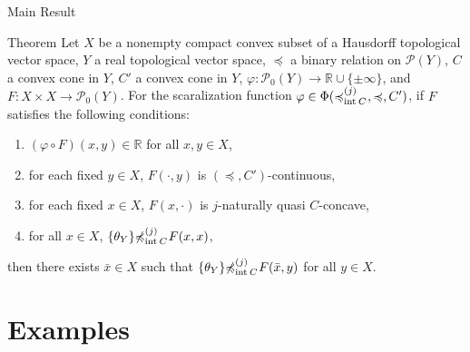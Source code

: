 \documentclass[aspectratio=169, dvipdfmx, 11pt]{beamer}
\newcommand{\RealNumberSet}{\mathbb{R}}
\newcommand{\Interior}[1]{\text{\rm int\:${#1}$}} %
\newcommand{\pow}[1]{\mathcal{P}_{0}(#1)}
\newcommand{\setrel}[2]{\preccurlyeq^{(#1)}_{#2}\!}
\newcommand{\notsetrel}[2]{{\not\preccurlyeq}^{(#1)}_{#2}\!}
\begin{document}
\begin{frame}{Main Result}
  \begin{block}{Theorem}
    Let $X$ be a nonempty compact convex subset of a Hausdorff topological vector space,
    $Y$ a real topological vector space, $\preccurlyeq$ a binary relation on $\mathcal{P}(Y)$,
    $C$ a convex cone in $Y$, $C'$ a convex cone in $Y$,
    $\varphi\colon \pow{Y} \to \RealNumberSet \cup \{\pm \infty\}$,
    and $F\colon X \times X \to \pow{Y}$.
    For the scaralization function $\varphi \in \Phi(\setrel{j}{\Interior{C}}\:, \preccurlyeq, C')$,
    if $F$ satisfies the following conditions:
    \begin{enumerate}
      \item $(\varphi \circ F)(x,y) \in \RealNumberSet$ for all $x,y \in X$,
      \item for each fixed $y \in X$, $F(\cdot,y)$ is $(\preccurlyeq, C')$-continuous,
      \item for each fixed $x \in X$, $F(x,\cdot)$ is $j$-naturally quasi $C$-concave,
      \item for all $x \in X$, $\{\theta_Y\} \notsetrel{j}{\Interior{C}}\: F(x,x) $,
    \end{enumerate}
    then there exists $\bar{x} \in X$ such that $\{\theta_Y\} \notsetrel{j}{\Interior{C}}\: F(\bar{x},y)$
    for all $y \in X$.
  \end{block}
\end{frame}

\section{Examples}
\end{document}
